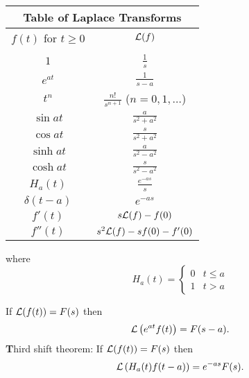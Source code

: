 \begin{center}
	\begin{tabular}{|c|c|}
		\hline
		\multicolumn{2}{|c|}{\textbf Table of Laplace Transforms}\\
		\hline
		$ f(t)$ { for} $t \geq 0$ &  ${\cal L}(f)$\\
		\hline
		&\\[1mm]
		$1$      & $\displaystyle \frac{1}{s}$\\[5mm]
		$e^{at}$ & $\displaystyle \frac{1}{s-a}$\\[5mm]
		$t^n$    & $\displaystyle \frac{n!}{s^{n+1}}$ ($n = 0,1, \ldots$)\\[5mm]
		$\sin at$ & $\displaystyle \frac{a}{s^2 + a^2}$\\[5mm]
		$\cos at$ & $\displaystyle \frac{s}{s^2 + a^2}$\\[5mm]
		$\sinh at$ & $\displaystyle \frac{a}{s^2 - a^2}$\\[5mm]
		$\cosh at$ & $\displaystyle \frac{s}{s^2 - a^2}$\\[5mm]
		$H_a(t)$ & $\displaystyle \frac{e^{-as}}{s}$\\[5mm]
		$\delta(t-a)$ & $\displaystyle e^{-as}$\\[5mm]
		$f'(t)$ & $s{\cal L}(f)-f(0)$\\[5mm]
		$f''(t)$ & $s^2{\cal L}(f)-sf(0)-f'(0)$
		\\[6mm]
		\hline
	\end{tabular}
\end{center}
where 
\[
H_a(t)=\left\{\begin{array}{ll}0&t \le a\\1&t>a\end{array}\right.
\]

 If ${\cal L}(f(t))=F(s)$ then
\[ {\cal L}\left(e^{at}f(t)\right)=F(s-a).\]
{\textbf Third shift theorem:} If ${\cal L}(f(t))=F(s)$ then
\[ {\cal L}\left(H_a(t)f(t-a)\right)=e^{-as}F(s).\]

